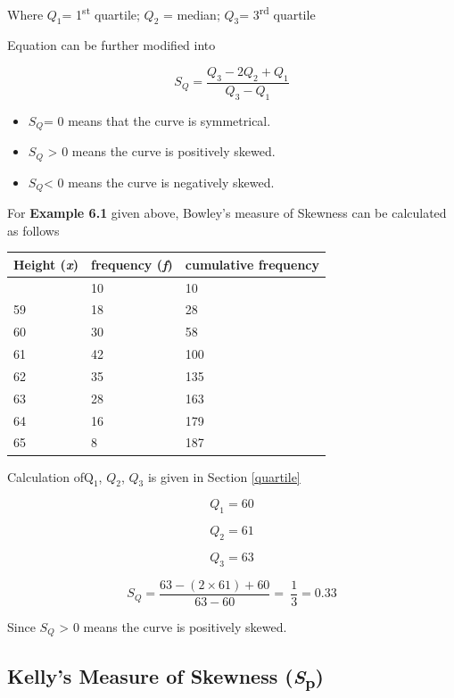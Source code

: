 \documentclass[
]{book}
\begin{document}
Where \(Q_{1}\)= 1\textsuperscript{st} quartile; \(Q_{2}\) = median; \(Q_{3}\)= 3\textsuperscript{rd} quartile

Equation can be further modified into

\[S_{Q} = \frac{Q_{3} - 2Q_{2} + Q_{1}}{Q_{3} - Q_{1}}\]

\begin{itemize}
\item
  \(S_{Q}\)= 0 means that the curve is symmetrical.
\item
  \(S_{Q}\) \textgreater{} 0 means the curve is positively skewed.
\item
  \(S_{Q}\)\textless{} 0 means the curve is negatively skewed.
\end{itemize}

For \textbf{Example 6.1} given above, Bowley's measure of Skewness can be calculated as follows

\begin{longtable}[]{@{}lll@{}}
\toprule\noalign{}
Height (\emph{x}) & frequency (\emph{f}) & cumulative frequency \\
\midrule\noalign{}
\endhead
\bottomrule\noalign{}
\endlastfoot
58 & 10 & 10 \\
59 & 18 & 28 \\
60 & 30 & 58 \\
61 & 42 & 100 \\
62 & 35 & 135 \\
63 & 28 & 163 \\
64 & 16 & 179 \\
65 & 8 & 187 \\
\end{longtable}

Calculation of\(\text{Q}_{1}\), \(Q_{2}\), \(Q_{3}\) is given in Section \ref{quartile}

\[{Q}_{1} = 60\]

\[Q_{2} = 61\]

\[Q_{3} = 63\]

\[S_{Q} = \frac{63 - (2 \times 61) + 60}{63 - 60} = \ \frac{1}{3} = 0.33\]

Since \(S_{Q}\) \textgreater{} 0 means the curve is positively skewed.

\subsection{\texorpdfstring{Kelly's Measure of Skewness (\emph{S}\textsubscript{p})}{Kelly's Measure of Skewness (Sp)}}\label{kellys-measure-of-skewness-sp}
\end{document}
